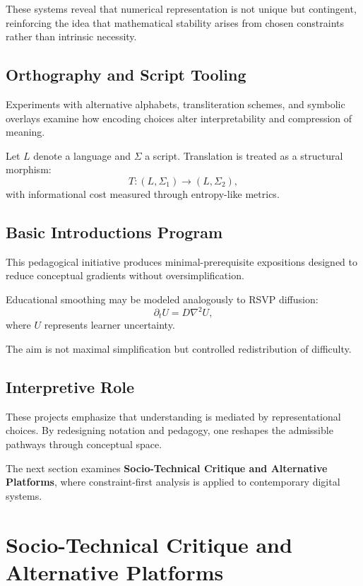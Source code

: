 \documentclass[12pt]{article}
\begin{document}
These systems reveal that numerical representation is not unique but contingent, reinforcing the idea that mathematical stability arises from chosen constraints rather than intrinsic necessity.

\subsection{Orthography and Script Tooling}

Experiments with alternative alphabets, transliteration schemes, and symbolic overlays examine how encoding choices alter interpretability and compression of meaning.

Let $L$ denote a language and $\Sigma$ a script. Translation is treated as a structural morphism:
\[
T : (L,\Sigma_1)\to(L,\Sigma_2),
\]
with informational cost measured through entropy-like metrics.

\subsection{Basic Introductions Program}

This pedagogical initiative produces minimal-prerequisite expositions designed to reduce conceptual gradients without oversimplification.

Educational smoothing may be modeled analogously to RSVP diffusion:
\[
\partial_t U = D\nabla^2 U,
\]
where $U$ represents learner uncertainty.

The aim is not maximal simplification but controlled redistribution of difficulty.

\subsection{Interpretive Role}

These projects emphasize that understanding is mediated by representational choices. By redesigning notation and pedagogy, one reshapes the admissible pathways through conceptual space.

\bigskip

The next section examines \textbf{Socio-Technical Critique and Alternative Platforms}, where constraint-first analysis is applied to contemporary digital systems.

\section{Socio-Technical Critique and Alternative Platforms}
\end{document}
